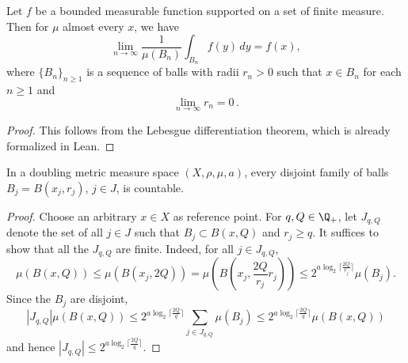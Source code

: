 \begin{lemma}
    \label{Lebesgue-differentiation}
    \leanok
    Let $f$ be a bounded measurable function supported on a set of finite measure. Then for $\mu$ almost every $x$, we have
    $$\lim_{n\to \infty} \frac{1}{\mu(B_n)}\int_{B_n} f(y)\, dy= f(x),$$
    where $\{B_n\}_{n\geq 1}$ is a sequence of balls with radii $r_n>0$ such that $x\in B_n$ for each $n\geq 1$ and
    \begin{equation*}
        \lim_{n\to \infty} r_n=0 \,.
    \end{equation*}
\end{lemma}
\begin{proof}
    \leanok
    This follows from the Lebesgue differentiation theorem, which is already formalized in Lean.
\end{proof}

\begin{lemma}
    \leanok
    \label{disjoint-family-countable}
    In a doubling metric measure space $(X,\rho,\mu, a)$, every disjoint family of balls $B_j = B(x_j, r_j)$, $j\in J$, is countable.
\end{lemma}
\begin{proof}
    \leanok
    Choose an arbitrary $x\in X$ as reference point. For $q, Q\in\Q_+$, let $J_{q,Q}$ denote the set of all $j\in J$ such that $B_j\subset B(x, Q)$ and $r_j \ge q$. It suffices to show that all the $J_{q,Q}$ are finite.
    Indeed, for all $j\in J_{q,Q}$,
    \begin{equation*}
        \mu(B(x, Q)) \le \mu(B(x_j, 2Q)) = \mu(B(x_j, \frac{2 Q}{r_j} r_j))
        \le 2^{a\log_2{\lceil \frac{2 Q}{r_j}\rceil}} \mu(B_j).
    \end{equation*}
    Since the $B_j$ are disjoint,
    \begin{equation}
        |J_{q,Q}| \mu(B(x, Q)) \le 2^{a\log_2{\lceil\frac{2Q}{q}\rceil}} \sum_{j\in J_{q,Q}} \mu(B_j) \le 2^{a\log_2{\lceil\frac{2Q}{q}\rceil}} \mu(B(x,Q))
    \end{equation}
    and hence $|J_{q,Q}| \le 2^{a\log_2{\lceil\frac{2Q}{q}\rceil}}$.
\end{proof}

